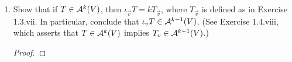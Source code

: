 \documentclass[../psets.tex]{subfiles}
\begin{document}
\begin{enumerate}[label={\textbf{1.7.\roman*.}}]
\begin{proof}
\begin{align*}
\begin{split}
            \end{split}\\
            \begin{split}
                ={}& \sum_{r=1}^p(-1)^{r-1}T_1(v_1,\dots,v_{r-1},v,v_r,\dots,v_{p-1})T_2(v_p,\dots,v_{p+q-1})\\
                &+\sum_{r=p+1}^{p+q}(-1)^{r-1}T_1(v_1,\dots,v_p)T_2(v_{p+1},\dots,v_{r-1},v,v_r,\dots,v_{p+q-1})
            \end{split}\\
            \begin{split}
                ={}& \left[ \sum_{r=1}^p(-1)^{r-1}T_1(v_1,\dots,v_{r-1},v,v_r,\dots,v_{p-1}) \right]\cdot T_2(v_p,\dots,v_{p+q-1})\\
                &+T_1(v_1,\dots,v_p)\cdot\sum_{r=p+1}^{p+q}(-1)^{r-1}T_2(v_{p+1},\dots,v_{r-1},v,v_r,\dots,v_{p+q-1})
            \end{split}\\
            \begin{split}
                ={}& \left[ \sum_{r=1}^p(-1)^{r-1}T_1(v_1,\dots,v_{r-1},v,v_r,\dots,v_{p-1}) \right]\cdot T_2(v_p,\dots,v_{p+q-1})\\
                &+T_1(v_1,\dots,v_p)\cdot(-1)^p\sum_{r=1}^q(-1)^{r-1}T_2(v_{p+1},\dots,v_{p+r-1},v,v_{p+r},\dots,v_{p+q-1})
            \end{split}\\
            \begin{split}
                ={}& (\iota_vT_1)(v_1,\dots,v_{p-1})\cdot T_2(v_p,\dots,v_{p+q-1})\\
                &+(-1)^pT_1(v_1,\dots,v_p)\cdot(\iota_vT_2)(v_{p+1},\dots,v_{p+q-1})
            \end{split}\\
            ={}& (\iota_vT_1\otimes T_2)(v_1,\dots,v_{p+q-1})+(-1)^p(T_1\otimes\iota_vT_2)(v_1,\dots,v_{p+q-1})\\
            ={}& [\iota_\vec{v}T_1\otimes T_2+(-1)^pT_1\otimes\iota_\vec{v}T_2](v_1,\dots,v_{p+q-1})
        \end{align*}
        as desired.
    \end{proof}
    \item Show that if $T\in\alt[k]{V}$, then $\iota_\vec{v}T=kT_\vec{v}$, where $T_\vec{v}$ is defined as in Exercise 1.3.vii. In particular, conclude that $\iota_\vec{v}T\in\alt[k-1]{V}$. (See Exercise 1.4.viii, which asserts that $T\in\alt[k]{V}$ implies $T_\vec{v}\in\alt[k-1]{V}$.)
    \begin{proof}

\end{proof}
\end{enumerate}
\end{document}
